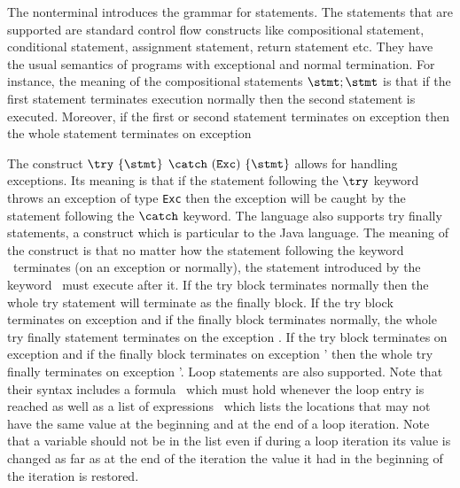    The nonterminal \stmt{} introduces the grammar for statements.  
   The statements that are supported are standard control flow constructs like 
    compositional statement, conditional statement, assignment statement, return statement etc.
    They have the usual semantics of programs with exceptional and normal termination.
     For instance, the meaning of the compositional statements $\stmt;\stmt  $
    is that if the first statement terminates execution normally then the second statement is executed. Moreover, if the first or second statement 
    terminates on exception then the whole statement terminates on exception 
    
  The construct  $ \try  \ \{ \stmt \} $ $ \catch \ (\mbox{\rm\texttt{Exc}})\ \{ \stmt \}  $  allows for handling exceptions.
  Its meaning is that if the statement following the $ \try $ keyword throws an exception of type \texttt{Exc} then
  the exception will be caught by the statement following the  $ \catch $ keyword. The language also supports 
  try finally statements, a construct which is particular to the Java language.
  The meaning of the construct is that  no matter how the statement following the keyword \try \ terminates (on an exception or normally),
  the statement introduced by the keyword \finally \ must execute after it. If the try block terminates normally then the
  whole try statement will terminate as the finally block. If the try block terminates on exception \Exc{} and if the finally block
  terminates normally, the whole try finally statement terminates  on the exception  \Exc{}.  If the try block terminates on exception \Exc{} and if the finally block
  terminates on exception \Exc' then the whole try finally  terminates on exception \Exc'.
  Loop statements are also supported.  Note that their syntax includes  a formula \invariant \ which must hold whenever 
  the loop entry is reached as well as a  list of expressions
  \modLoop \ which lists the locations that  may not have the same value at the beginning
  and at the end of a loop iteration. Note that a  variable should not be in the list \modLoop{} even if during a loop iteration its value is changed
  as far as at the end of the iteration the value it had in the beginning of the iteration is restored.

